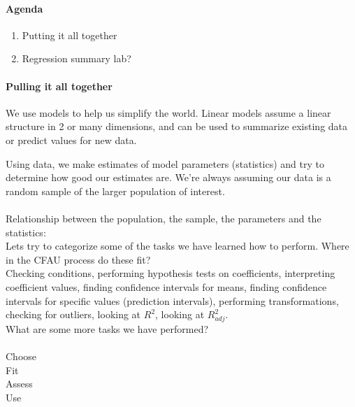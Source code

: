 \documentclass[10pt]{article}
\begin{document}


\paragraph{Agenda}
\begin{enumerate}
  \itemsep0em
  \item Putting it all together
  \item Regression summary lab?
\end{enumerate}

\paragraph{Pulling it all together}
We use models to help us simplify the world. Linear models assume a linear structure in 2 or many dimensions, and can be used to summarize existing data or predict values for new data. 

Using data, we make estimates of model parameters (statistics) and try to determine how good our estimates are. We're always assuming our data is a random sample of the larger population of interest. 
\\
\\ Relationship between the population, the sample, the parameters and the statistics:
\vspace{1.5in}
\\
Lets try to categorize some of the tasks we have learned how to perform. Where in the CFAU process do these fit?
\\ Checking conditions, performing hypothesis tests on coefficients, interpreting coefficient values, finding confidence intervals for means, finding confidence intervals for specific values (prediction intervals), performing transformations, checking for outliers, looking at $R^2$, looking at $R^2_{adj}$. 
\\
What are some more tasks we have performed?
\\
\\
Choose
\vspace{1in}
\\
Fit
\vspace{1in}
\\
Assess
\vspace{1in}
\\
Use
\vspace{1in}
\end{document}
